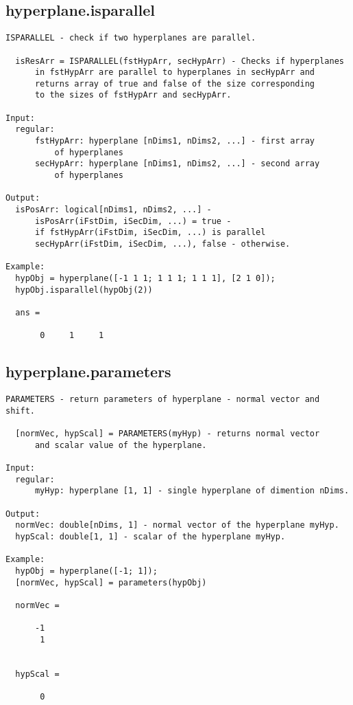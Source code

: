 \subsection{\texorpdfstring{hyperplane.isparallel}{isparallel}}\label{method:hyperplane.isparallel}
\begin{verbatim}
ISPARALLEL - check if two hyperplanes are parallel.

  isResArr = ISPARALLEL(fstHypArr, secHypArr) - Checks if hyperplanes
      in fstHypArr are parallel to hyperplanes in secHypArr and
      returns array of true and false of the size corresponding
      to the sizes of fstHypArr and secHypArr.

Input:
  regular:
      fstHypArr: hyperplane [nDims1, nDims2, ...] - first array
          of hyperplanes
      secHypArr: hyperplane [nDims1, nDims2, ...] - second array
          of hyperplanes

Output:
  isPosArr: logical[nDims1, nDims2, ...] -
      isPosArr(iFstDim, iSecDim, ...) = true -
      if fstHypArr(iFstDim, iSecDim, ...) is parallel
      secHypArr(iFstDim, iSecDim, ...), false - otherwise.

Example:
  hypObj = hyperplane([-1 1 1; 1 1 1; 1 1 1], [2 1 0]);
  hypObj.isparallel(hypObj(2))

  ans =

       0     1     1
\end{verbatim}
\subsection{\texorpdfstring{hyperplane.parameters}{parameters}}\label{method:hyperplane.parameters}
\begin{verbatim}
PARAMETERS - return parameters of hyperplane - normal vector and shift.

  [normVec, hypScal] = PARAMETERS(myHyp) - returns normal vector
      and scalar value of the hyperplane.

Input:
  regular:
      myHyp: hyperplane [1, 1] - single hyperplane of dimention nDims.

Output:
  normVec: double[nDims, 1] - normal vector of the hyperplane myHyp.
  hypScal: double[1, 1] - scalar of the hyperplane myHyp.

Example:
  hypObj = hyperplane([-1; 1]);
  [normVec, hypScal] = parameters(hypObj)

  normVec =

      -1
       1


  hypScal =

       0
\end{verbatim}
